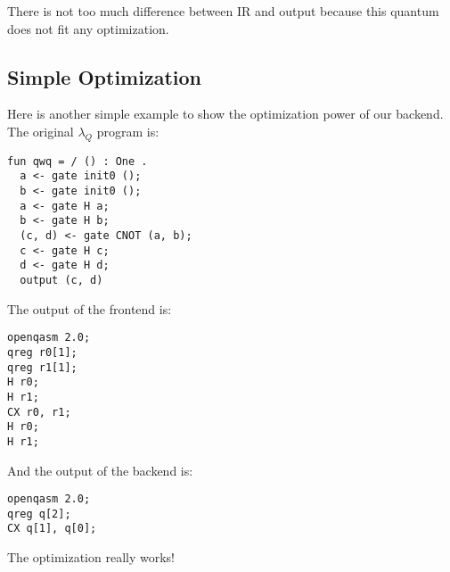 There is not too much difference between IR and output because this quantum does not fit any optimization.

\subsection{Simple Optimization}
Here is another simple example to show the optimization power of our backend.
The original $\lambda_Q$ program is:
\begin{lstlisting}[language=lambda]
fun qwq = / () : One .
  a <- gate init0 ();
  b <- gate init0 ();
  a <- gate H a;
  b <- gate H b;
  (c, d) <- gate CNOT (a, b);
  c <- gate H c;
  d <- gate H d;
  output (c, d)
\end{lstlisting}

The output of the frontend is:
\begin{lstlisting}[language=lambda]
openqasm 2.0;
qreg r0[1];
qreg r1[1];
H r0;
H r1;
CX r0, r1;
H r0;
H r1;
\end{lstlisting}

And the output of the backend is:
\begin{lstlisting}[language=lambda]
openqasm 2.0;
qreg q[2];
CX q[1], q[0];
\end{lstlisting}

The optimization really works!